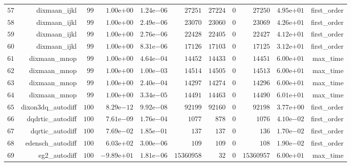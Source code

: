 \documentclass[varwidth=20cm,crop=true]{standalone}
\begin{document}
\begin{longtable}{rrrrrrrrrrr}
  \(    57\) & dixmaan\_ijkl & \(    99\) & \( 1.00\)e\(+00\) & \( 1.24\)e\(-06\) & \( 27251\) & \( 27224\) & \(     0\) & \( 27250\) & \( 4.95\)e\(+01\) & first\_order \\
  \(    58\) & dixmaan\_ijkl & \(    99\) & \( 1.00\)e\(+00\) & \( 2.49\)e\(-06\) & \( 23070\) & \( 23060\) & \(     0\) & \( 23069\) & \( 4.26\)e\(+01\) & first\_order \\
  \(    59\) & dixmaan\_ijkl & \(    99\) & \( 1.00\)e\(+00\) & \( 2.76\)e\(-06\) & \( 22428\) & \( 22405\) & \(     0\) & \( 22427\) & \( 4.12\)e\(+01\) & first\_order \\
  \(    60\) & dixmaan\_ijkl & \(    99\) & \( 1.00\)e\(+00\) & \( 8.31\)e\(-06\) & \( 17126\) & \( 17103\) & \(     0\) & \( 17125\) & \( 3.12\)e\(+01\) & first\_order \\
  \(    61\) & dixmaan\_mnop & \(    99\) & \( 1.00\)e\(+00\) & \( 4.64\)e\(-04\) & \( 14452\) & \( 14433\) & \(     0\) & \( 14451\) & \( 6.00\)e\(+01\) & max\_time \\
  \(    62\) & dixmaan\_mnop & \(    99\) & \( 1.00\)e\(+00\) & \( 1.00\)e\(-03\) & \( 14514\) & \( 14505\) & \(     0\) & \( 14513\) & \( 6.00\)e\(+01\) & max\_time \\
  \(    63\) & dixmaan\_mnop & \(    99\) & \( 1.00\)e\(+00\) & \( 2.40\)e\(-04\) & \( 14297\) & \( 14274\) & \(     0\) & \( 14296\) & \( 6.00\)e\(+01\) & max\_time \\
  \(    64\) & dixmaan\_mnop & \(    99\) & \( 1.00\)e\(+00\) & \( 3.34\)e\(-05\) & \( 14491\) & \( 14463\) & \(     0\) & \( 14490\) & \( 6.01\)e\(+01\) & max\_time \\
  \(    65\) & dixon3dq\_autodiff & \(   100\) & \( 8.29\)e\(-12\) & \( 9.92\)e\(-08\) & \( 92199\) & \( 92160\) & \(     0\) & \( 92198\) & \( 3.77\)e\(+00\) & first\_order \\
  \(    66\) & dqdrtic\_autodiff & \(   100\) & \( 7.61\)e\(-09\) & \( 1.76\)e\(-04\) & \(  1077\) & \(   878\) & \(     0\) & \(  1076\) & \( 4.10\)e\(-02\) & first\_order \\
  \(    67\) & dqrtic\_autodiff & \(   100\) & \( 7.69\)e\(-02\) & \( 1.85\)e\(-01\) & \(   137\) & \(   137\) & \(     0\) & \(   136\) & \( 1.70\)e\(-02\) & first\_order \\
  \(    68\) & edensch\_autodiff & \(   100\) & \( 6.03\)e\(+02\) & \( 3.00\)e\(-06\) & \(   109\) & \(   109\) & \(     0\) & \(   108\) & \( 1.90\)e\(-02\) & first\_order \\
  \(    69\) & eg2\_autodiff & \(   100\) & \(-9.89\)e\(+01\) & \( 1.81\)e\(-06\) & \(15360958\) & \(    32\) & \(     0\) & \(15360957\) & \( 6.00\)e\(+01\) & max\_time \\

\end{longtable}
\end{document}
